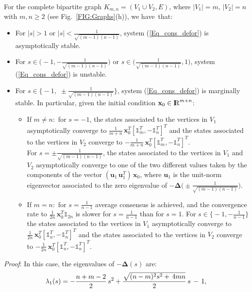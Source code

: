 \documentclass[letterpaper,9pt,twocolumn]{autart}
\newcommand{\rr}{\mathop{{\rm I}\mskip-4.0mu{\rm R}}\nolimits}
\newcommand{\vet}[1]{\ensuremath{{\mathbf #1}}}
\begin{document}
\begin{proposition}\label{Prop_Com_bip}
For the complete bipartite graph $K_{m,n} = (V_1 \cup V_2,E)$,
where \mbox{$|V_1| = m$}, $|V_2| = n$ with $m,n \geq 2$ 
(see Fig.~\ref{FIG:Graphs}(h)), we have~that:
\begin{itemize}
\item For $|s| > 1$ or $|s| < \frac{1}{\sqrt{(m-1)(n-1)}}$, system (\ref{Eq_cons_defor}) is asymptotically stable.
\item For $s \in \big(-1, -\frac{1}{\sqrt{(m-1)(n-1)}}\big)$ or $s
  \in \big(\frac{1}{\sqrt{(m-1)(n-1)}}, 1\big)$, system (\ref{Eq_cons_defor}) is unstable.
\item For $s \in \big\{\!-1,\,\,\pm \frac{1}{\sqrt{(m-1)(n-1)}}\big\}$,
system (\ref{Eq_cons_defor}) is marginally stable.
In particular, given the initial condition \mbox{$\vet{x}_0 \in \rr^{m+n}$}:
\begin{itemize}
\item If $m \neq n$:\, for $s = -1$, the states associated to the vertices in $V_1$ asymptotically converge to
$\frac{1}{m+n}\,\vet{x}_0^T[\mathds{1}^T_m, -\!\mathds{1}^T_n]^T$ and
the states associated to the vertices in $V_2$ converge to $-\frac{1}{m+n}\,\vet{x}_0^T[\mathds{1}^T_m, -\!\mathds{1}^T_n]^T$.\\
For $s = \pm \frac{1}{\sqrt{(m-1)(n-1)}}$, the states associated to the vertices
in $V_1$ and $V_2$ asymptotically converge to one of the two different
values taken by the components of the vector $(\vet{u}_1\,\vet{u}^T_1)\,\vet{x}_0$, where 
$\vet{u}_1$ is the unit-norm eigenvector associated to the zero
eigenvalue of $-\boldsymbol{\Delta}\big(\pm\frac{1}{\sqrt{(m-1)(n-1)}}\big)$.
\item If $m = n$:\, for $s = \frac{1}{n-1}$ average consensus is achieved, and the convergence rate to
$\frac{1}{2n}\,\vet{x}_0^T\mathds{1}_{2n}$ is slower for $s = \frac{1}{n-1}$ than for \mbox{$s = 1$}.
For \mbox{$s \in \big\{\!\!-1, -\frac{1}{n-1}\big\}$} the states
associated to the vertices in $V_1$ asymptotically converge to 
$\frac{1}{2n}\,\vet{x}_0^T[\mathds{1}^T_n\!,-\mathds{1}^T_n]^T$ and the states associated to the vertices in $V_2$
converge to $-\frac{1}{2n}\,\vet{x}_0^T[\mathds{1}^T_n\!,-\mathds{1}^T_n]^T$.
\end{itemize}
\end{itemize}
\emph{Proof}:
In this case, the eigenvalues of $-\boldsymbol{\Delta}(s)$ are: 
$$
\begin{array}{l}
\displaystyle \lambda_{1}(s) = -\frac{n+m-2}{2}\,s^2 + \frac{\sqrt{(n-m)^2 s^2 +\, 4mn}}{2}\,s \,-\, 1,\vspace{0.42cm}\\

\end{array}$$
\end{proposition}
\end{document}
